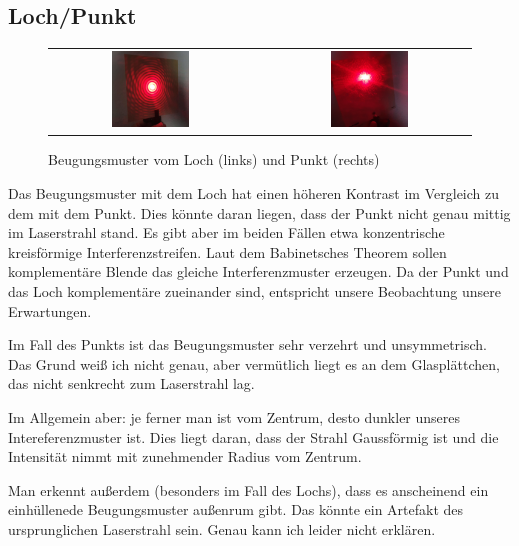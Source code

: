  	\subsection{Loch/Punkt}
 		\begin{figure}[H]
		\centering
 			\begin{tabular}{c p{1em} c}
 				\includegraphics[width=0.4\textwidth]{images/tv4-hole.jpg} &&
 				\includegraphics[width=0.4\textwidth]{images/tv4-dot.jpg} 
 			\end{tabular}
	 		\caption{\centering Beugungsmuster vom Loch (links) und Punkt (rechts)}
			\vspace{-1em}
		\end{figure}
		Das Beugungsmuster mit dem Loch hat einen höheren Kontrast im Vergleich zu dem mit dem Punkt. Dies könnte daran liegen, dass der Punkt nicht genau mittig im Laserstrahl stand. Es gibt aber im beiden Fällen etwa konzentrische kreisförmige Interferenzstreifen. Laut dem Babinetsches Theorem sollen komplementäre Blende das gleiche Interferenzmuster erzeugen. Da der Punkt und das Loch komplementäre zueinander sind, entspricht unsere Beobachtung unsere Erwartungen. 

		Im Fall des Punkts ist das Beugungsmuster sehr verzehrt und unsymmetrisch. Das Grund weiß ich nicht genau, aber vermütlich liegt es an dem Glasplättchen, das nicht senkrecht zum Laserstrahl lag. 

		Im Allgemein aber: je ferner man ist vom Zentrum, desto dunkler unseres Intereferenzmuster ist. Dies liegt daran, dass der Strahl Gaussförmig ist und die Intensität nimmt mit zunehmender Radius vom Zentrum. 

		Man erkennt außerdem (besonders im Fall des Lochs), dass es anscheinend ein einhüllenede Beugungsmuster außenrum gibt. Das könnte ein Artefakt des ursprunglichen Laserstrahl sein. Genau kann ich leider nicht erklären. 